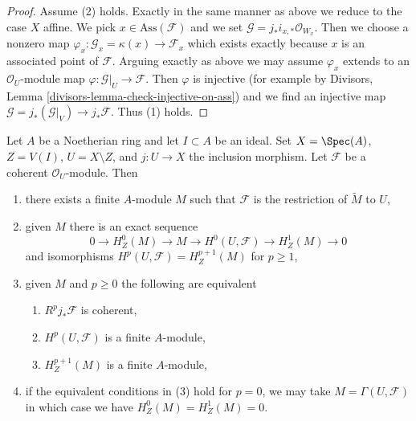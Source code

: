 \begin{proof}
\medskip\noindent
Assume (2) holds. Exactly in the same manner as above we reduce
to the case $X$ affine. We pick $x \in \text{Ass}(\mathcal{F})$
and we set $\mathcal{G} = j_*i_{x, *}\mathcal{O}_{W_x}$.
Then we choose a nonzero map
$\varphi_x : \mathcal{G}_x = \kappa(x) \to \mathcal{F}_x$
which exists exactly because $x$ is an associated point of $\mathcal{F}$.
Arguing exactly as above we may assume $\varphi_x$
extends to an $\mathcal{O}_U$-module map
$\varphi : \mathcal{G}|_U \to \mathcal{F}$.
Then $\varphi$ is injective (for example by
Divisors, Lemma \ref{divisors-lemma-check-injective-on-ass})
and we find an injective map
$\mathcal{G} = j_*(\mathcal{G}|_V) \to j_*\mathcal{F}$.
Thus (1) holds.
\end{proof}

\begin{lemma}
\label{lemma-finiteness-pushforwards-and-H1-local}
Let $A$ be a Noetherian ring and let $I \subset A$ be an ideal.
Set $X = \Spec(A)$, $Z = V(I)$, $U = X \setminus Z$, and $j : U \to X$
the inclusion morphism. Let $\mathcal{F}$ be a coherent $\mathcal{O}_U$-module.
Then
\begin{enumerate}
\item there exists a finite $A$-module $M$ such that $\mathcal{F}$ is the
restriction of $\widetilde{M}$ to $U$,
\item given $M$ there is an exact sequence
$$
0 \to H^0_Z(M) \to M \to H^0(U, \mathcal{F}) \to H^1_Z(M) \to 0
$$
and isomorphisms $H^p(U, \mathcal{F}) = H^{p + 1}_Z(M)$ for $p \geq 1$,
\item given $M$ and $p \geq 0$ the following are equivalent
\begin{enumerate}
\item $R^pj_*\mathcal{F}$ is coherent,
\item $H^p(U, \mathcal{F})$ is a finite $A$-module,
\item $H^{p + 1}_Z(M)$ is a finite $A$-module,
\end{enumerate}
\item if the equivalent conditions in (3) hold for $p = 0$, we may take
$M = \Gamma(U, \mathcal{F})$ in which case we have $H^0_Z(M) = H^1_Z(M) = 0$.
\end{enumerate}
\end{lemma}

